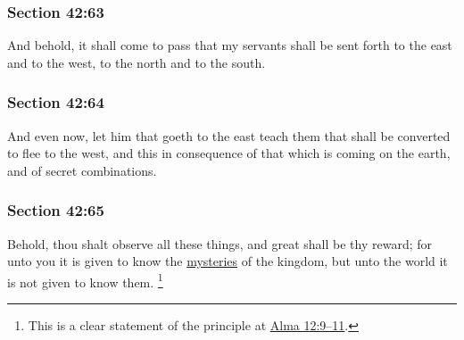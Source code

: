 	\subsubsection{Section 42:63} %
		\label{DC42-63}

		And behold, it shall come to pass that my servants shall be sent forth to the east and to the west, to the north and to the south.


	\subsubsection{Section 42:64} %
		\label{DC42-64}

		And even now, let him that goeth to the east teach them that shall be converted to flee to the west, and this in consequence of that which is coming on the earth, and of secret combinations.


	\subsubsection{Section 42:65} %
		\label{DC42-65}

		Behold, thou shalt observe all these things, and great shall be thy reward; for unto you it is given to know the \hyperref[MYSTERY]{mysteries} of the kingdom, but unto the world it is not given to know them.%
			\footnote{%
				This is a clear statement of the principle at \hyperref[ALMA-12-9]{Alma 12:9--11}.
				}



